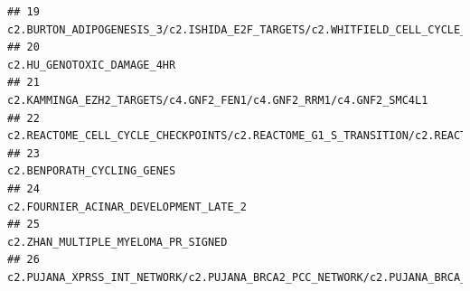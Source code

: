 \documentclass{article}\usepackage[]{graphicx}\usepackage[]{color}
\makeatletter
\newenvironment{kframe}{%
 \def\at@end@of@kframe{}%
 \ifinner\ifhmode%
  \def\at@end@of@kframe{\end{minipage}}%
  \begin{minipage}{\columnwidth}%
 \fi\fi%
 \def\FrameCommand##1{\hskip\@totalleftmargin \hskip-\fboxsep
 \colorbox{shadecolor}{##1}\hskip-\fboxsep
     \hskip-\linewidth \hskip-\@totalleftmargin \hskip\columnwidth}%
 \MakeFramed {\advance\hsize-\width
   \@totalleftmargin\z@ \linewidth\hsize
   \@setminipage}}%
 {\par\unskip\endMakeFramed%
 \at@end@of@kframe}
\newenvironment{knitrout}{}{} %
\makeatother
\begin{document}
\begin{knitrout}
\begin{kframe}
\begin{verbatim}
## 19                                                                                                                                                                                                                                                                      c2.BURTON_ADIPOGENESIS_3/c2.ISHIDA_E2F_TARGETS/c2.WHITFIELD_CELL_CYCLE_LITERATURE
## 20                                                                                                                                                                                                                                                                                                                             c2.HU_GENOTOXIC_DAMAGE_4HR
## 21                                                                                                                                                                                                                                                                                      c2.KAMMINGA_EZH2_TARGETS/c4.GNF2_FEN1/c4.GNF2_RRM1/c4.GNF2_SMC4L1
## 22                                                                                                                                       c2.REACTOME_CELL_CYCLE_CHECKPOINTS/c2.REACTOME_G1_S_TRANSITION/c2.REACTOME_SYNTHESIS_OF_DNA/c2.REACTOME_MITOTIC_G1_G1_S_PHASES/c2.REACTOME_MITOTIC_M_M_G1_PHASES/c2.REACTOME_DNA_REPLICATION/c2.REACTOME_S_PHASE
## 23                                                                                                                                                                                                                                                                                                                             c2.BENPORATH_CYCLING_GENES
## 24                                                                                                                                                                                                                                                                                                                  c2.FOURNIER_ACINAR_DEVELOPMENT_LATE_2
## 25                                                                                                                                                                                                                                                                                                                     c2.ZHAN_MULTIPLE_MYELOMA_PR_SIGNED
## 26                                                                                                                                                                                                                                                                c2.PUJANA_XPRSS_INT_NETWORK/c2.PUJANA_BRCA2_PCC_NETWORK/c2.PUJANA_BRCA_CENTERED_NETWORK

\end{verbatim}
\end{kframe}
\end{knitrout}
\end{document}
